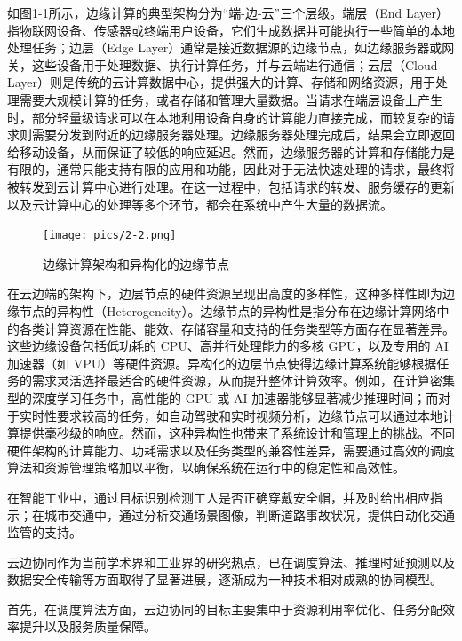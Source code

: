 如图1-1所示，边缘计算的典型架构分为“端-边-云”三个层级\cite{xie2021serverless}。端层（End Layer）指物联网设备、传感器或终端用户设备，它们生成数据并可能执行一些简单的本地处理任务；边层（Edge Layer）通常是接近数据源的边缘节点，如边缘服务器或网关，这些设备用于处理数据、执行计算任务，并与云端进行通信；云层（Cloud Layer）则是传统的云计算数据中心，提供强大的计算、存储和网络资源，用于处理需要大规模计算的任务，或者存储和管理大量数据。当请求在端层设备上产生时，部分轻量级请求可以在本地利用设备自身的计算能力直接完成，而较复杂的请求则需要分发到附近的边缘服务器处理。边缘服务器处理完成后，结果会立即返回给移动设备，从而保证了较低的响应延迟。然而，边缘服务器的计算和存储能力是有限的，通常只能支持有限的应用和功能，因此对于无法快速处理的请求，最终将被转发到云计算中心进行处理。在这一过程中，包括请求的转发、服务缓存的更新以及云计算中心的处理等多个环节，都会在系统中产生大量的数据流。

\begin{figure}[ht]
  \centering
  \texttt{[image: pics/2-2.png]}
  \caption{边缘计算架构和异构化的边缘节点}
  \label{fig:my_label}
\end{figure}

在云边端的架构下，边层节点的硬件资源呈现出高度的多样性，这种多样性即为边缘节点的异构性（Heterogeneity）。边缘节点的异构性是指分布在边缘计算网络中的各类计算资源在性能、能效、存储容量和支持的任务类型等方面存在显著差异\cite{cooke2020model,varghese2021survey,barbalace2020edge}。这些边缘设备包括低功耗的 CPU、高并行处理能力的多核 GPU，以及专用的 AI 加速器（如 VPU）等硬件资源。异构化的边层节点使得边缘计算系统能够根据任务的需求灵活选择最适合的硬件资源，从而提升整体计算效率\cite{varghese2020survey}。例如，在计算密集型的深度学习任务中，高性能的 GPU 或 AI 加速器能够显著减少推理时间；而对于实时性要求较高的任务，如自动驾驶和实时视频分析，边缘节点可以通过本地计算提供毫秒级的响应。然而，这种异构性也带来了系统设计和管理上的挑战。不同硬件架构的计算能力、功耗需求以及任务类型的兼容性差异，需要通过高效的调度算法和资源管理策略加以平衡，以确保系统在运行中的稳定性和高效性\cite{das2018edgebench}。


在智能工业中，通过目标识别检测工人是否正确穿戴安全帽，并及时给出相应指示；在城市交通中，通过分析交通场景图像，判断道路事故状况，提供自动化交通监管的支持。





云边协同作为当前学术界和工业界的研究热点，已在调度算法、推理时延预测以及数据安全传输等方面取得了显著进展，逐渐成为一种技术相对成熟的协同模型。

首先，在调度算法方面，云边协同的目标主要集中于资源利用率优化、任务分配效率提升以及服务质量保障。

